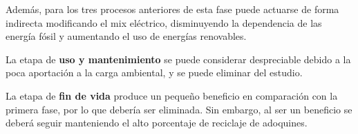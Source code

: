 Además, para los tres procesos anteriores de esta fase puede actuarse de forma indirecta modificando el mix eléctrico, disminuyendo la dependencia de las energía fósil y aumentando el uso de energías renovables.

La etapa de \textbf{uso y mantenimiento} se puede considerar despreciable debido a la poca aportación a la carga ambiental, y se puede eliminar del estudio.

La etapa de \textbf{fin de vida} produce un pequeño beneficio en comparación con la primera fase, por lo que debería ser eliminada. Sin embargo, al ser un beneficio se deberá seguir manteniendo el alto porcentaje de reciclaje de adoquines.
